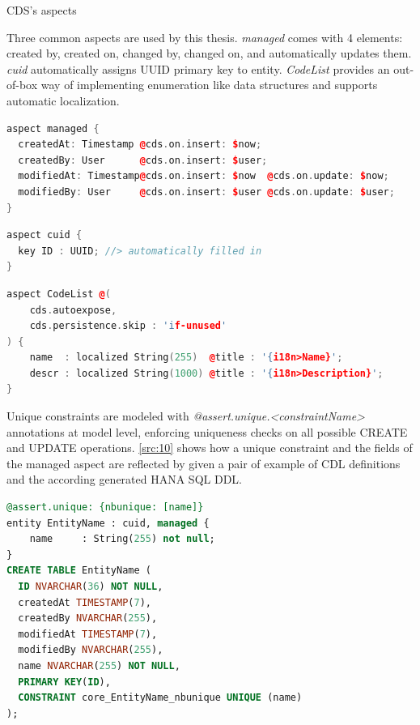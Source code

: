 \begin{description}
    \item[CDS's aspects] \cite{cap-cds-common-aspects}
\end{description}

Three common aspects are used by this thesis. \textit{managed} comes with 4 elements: created by, created on, changed by, changed on, and automatically updates them. \textit{cuid} automatically assigns UUID primary key to entity. \textit{CodeList} provides an out-of-box way of implementing enumeration like data structures and supports automatic localization.

\begin{lstlisting}[language={c++}]
aspect managed {
  createdAt: Timestamp @cds.on.insert: $now;
  createdBy: User      @cds.on.insert: $user;
  modifiedAt: Timestamp@cds.on.insert: $now  @cds.on.update: $now;
  modifiedBy: User     @cds.on.insert: $user @cds.on.update: $user;
}
\end{lstlisting}

\begin{lstlisting}[language={c++}]
aspect cuid {
  key ID : UUID; //> automatically filled in
}
\end{lstlisting}

\begin{lstlisting}[language={c++}]
aspect CodeList @(
    cds.autoexpose,
    cds.persistence.skip : 'if-unused'
) {
    name  : localized String(255)  @title : '{i18n>Name}';
    descr : localized String(1000) @title : '{i18n>Description}';
}
\end{lstlisting}

Unique constraints are modeled with \textit{@assert.unique.<constraintName>} annotations \cite{cap-cds-common-annotations} at model level, enforcing uniqueness checks on all possible CREATE and UPDATE operations.
\autoref{src:10} shows how a unique constraint and the fields of the managed aspect are reflected by given a pair of example of CDL definitions and the according generated HANA SQL DDL.

\begin{lstlisting}[language={sql}]
@assert.unique: {nbunique: [name]}
entity EntityName : cuid, managed {
    name     : String(255) not null;
}
CREATE TABLE EntityName (
  ID NVARCHAR(36) NOT NULL,
  createdAt TIMESTAMP(7),
  createdBy NVARCHAR(255),
  modifiedAt TIMESTAMP(7),
  modifiedBy NVARCHAR(255),
  name NVARCHAR(255) NOT NULL,
  PRIMARY KEY(ID),
  CONSTRAINT core_EntityName_nbunique UNIQUE (name)
); 
\end{lstlisting}


